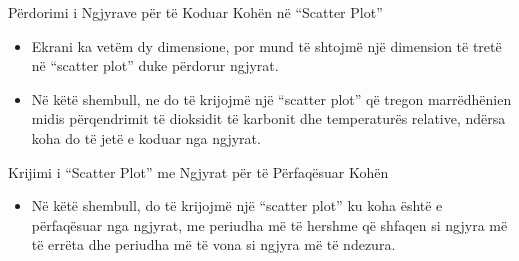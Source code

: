 \documentclass[
  ignorenonframetext,
]{beamer}
\providecommand{\tightlist}{%
  \setlength{\itemsep}{0pt}\setlength{\parskip}{0pt}}
\begin{document}
\begin{frame}{Përdorimi i Ngjyrave për të Koduar Kohën në ``Scatter
Plot''}
\protect\hypertarget{puxebrdorimi-i-ngjyrave-puxebr-tuxeb-koduar-kohuxebn-nuxeb-scatter-plot}{}
\begin{itemize}
\item
  Ekrani ka vetëm dy dimensione, por mund të shtojmë një dimension të
  tretë në ``scatter plot'' duke përdorur ngjyrat.
\item
  Në këtë shembull, ne do të krijojmë një ``scatter plot'' që tregon
  marrëdhënien midis përqendrimit të dioksidit të karbonit dhe
  temperaturës relative, ndërsa koha do të jetë e koduar nga ngjyrat.
\end{itemize}
\end{frame}

\begin{frame}{Krijimi i ``Scatter Plot'' me Ngjyrat për të Përfaqësuar
Kohën}
\protect\hypertarget{krijimi-i-scatter-plot-me-ngjyrat-puxebr-tuxeb-puxebrfaquxebsuar-kohuxebn}{}
\begin{itemize}
\tightlist
\item
  Në këtë shembull, do të krijojmë një ``scatter plot'' ku koha është e
  përfaqësuar nga ngjyrat, me periudha më të hershme që shfaqen si
  ngjyra më të errëta dhe periudha më të vona si ngjyra më të ndezura.
\end{itemize}
\end{frame}
\end{document}
